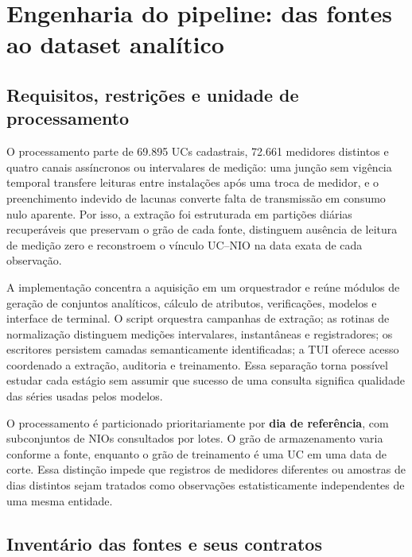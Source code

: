 \chapter{Engenharia do pipeline: das fontes ao dataset analítico}\label{engenharia-do-pipeline-das-fontes-ao-dataset-analuxedtico}

\section{Requisitos, restrições e unidade de processamento}\label{requisitos-restriuxe7uxf5es-e-unidade-de-processamento}

O processamento parte de 69.895 UCs cadastrais, 72.661 medidores distintos e quatro canais assíncronos ou intervalares de medição: uma junção sem vigência temporal transfere leituras entre instalações após uma troca de medidor, e o preenchimento indevido de lacunas converte falta de transmissão em consumo nulo aparente. Por isso, a extração foi estruturada em partições diárias recuperáveis que preservam o grão de cada fonte, distinguem ausência de leitura de medição zero e reconstroem o vínculo UC--NIO na data exata de cada observação.

A implementação concentra a aquisição em um orquestrador e reúne módulos de geração de conjuntos analíticos, cálculo de atributos, verificações, modelos e interface de terminal. O script orquestra campanhas de extração; as rotinas de normalização distinguem medições intervalares, instantâneas e registradores; os escritores persistem camadas semanticamente identificadas; a TUI oferece acesso coordenado a extração, auditoria e treinamento. Essa separação torna possível estudar cada estágio sem assumir que sucesso de uma consulta significa qualidade das séries usadas pelos modelos.

O processamento é particionado prioritariamente por \textbf{dia de referência}, com subconjuntos de NIOs consultados por lotes. O grão de armazenamento varia conforme a fonte, enquanto o grão de treinamento é uma UC em uma data de corte. Essa distinção impede que registros de medidores diferentes ou amostras de dias distintos sejam tratados como observações estatisticamente independentes de uma mesma entidade.

\section{Inventário das fontes e seus contratos}\label{inventuxe1rio-das-fontes-e-seus-contratos}

